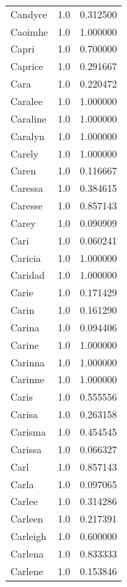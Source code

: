 \documentclass[
  letterpaper,
  DIV=11,
  numbers=noendperiod]{scrreprt}
\begin{document}
\begin{tabular}{lrr}
Candyce         &   1.0 &   0.312500 \\
Caoimhe         &   1.0 &   1.000000 \\
Capri           &   1.0 &   0.700000 \\
Caprice         &   1.0 &   0.291667 \\
Cara            &   1.0 &   0.220472 \\
Caralee         &   1.0 &   1.000000 \\
Caraline        &   1.0 &   1.000000 \\
Caralyn         &   1.0 &   1.000000 \\
Carely          &   1.0 &   1.000000 \\
Caren           &   1.0 &   0.116667 \\
Caressa         &   1.0 &   0.384615 \\
Caresse         &   1.0 &   0.857143 \\
Carey           &   1.0 &   0.090909 \\
Cari            &   1.0 &   0.060241 \\
Caricia         &   1.0 &   1.000000 \\
Caridad         &   1.0 &   1.000000 \\
Carie           &   1.0 &   0.171429 \\
Carin           &   1.0 &   0.161290 \\
Carina          &   1.0 &   0.094406 \\
Carine          &   1.0 &   1.000000 \\
Carinna         &   1.0 &   1.000000 \\
Carinne         &   1.0 &   1.000000 \\
Caris           &   1.0 &   0.555556 \\
Carisa          &   1.0 &   0.263158 \\
Carisma         &   1.0 &   0.454545 \\
Carissa         &   1.0 &   0.066327 \\
Carl            &   1.0 &   0.857143 \\
Carla           &   1.0 &   0.097065 \\
Carlee          &   1.0 &   0.314286 \\
Carleen         &   1.0 &   0.217391 \\
Carleigh        &   1.0 &   0.600000 \\
Carlena         &   1.0 &   0.833333 \\
Carlene         &   1.0 &   0.153846 \\

\end{tabular}
\end{document}

